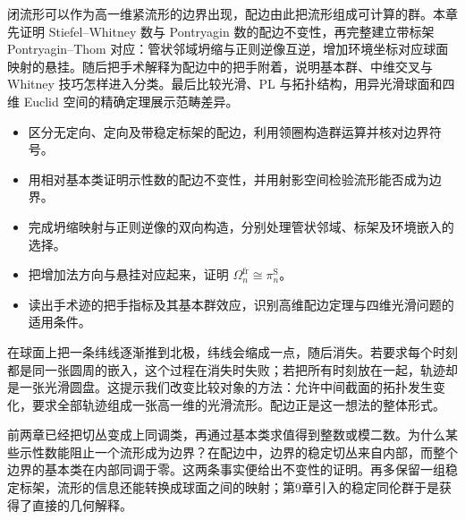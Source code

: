 
% 
% 


\begin{chapterabstract}
	闭流形可以作为高一维紧流形的边界出现，配边由此把流形组成可计算的群。本章先证明 Stiefel--Whitney 数与 Pontryagin 数的配边不变性，再完整建立带标架 Pontryagin--Thom 对应：管状邻域坍缩与正则逆像互逆，增加环境坐标对应球面映射的悬挂。随后把手术解释为配边中的把手附着，说明基本群、中维交叉与 Whitney 技巧怎样进入分类。最后比较光滑、PL 与拓扑结构，用异光滑球面和四维 Euclid 空间的精确定理展示范畴差异。
\end{chapterabstract}

\begin{learninggoals}
	\begin{itemize}
		\item 区分无定向、定向及带稳定标架的配边，利用领圈构造群运算并核对边界符号。
		\item 用相对基本类证明示性数的配边不变性，并用射影空间检验流形能否成为边界。
		\item 完成坍缩映射与正则逆像的双向构造，分别处理管状邻域、标架及环境嵌入的选择。
		\item 把增加法方向与悬挂对应起来，证明 \(\Omega_n^{\mathrm{fr}}\cong\pi_n^{\mathrm S}\)。
		\item 读出手术迹的把手指标及其基本群效应，识别高维配边定理与四维光滑问题的适用条件。
	\end{itemize}
\end{learninggoals}

在球面上把一条纬线逐渐推到北极，纬线会缩成一点，随后消失。若要求每个时刻都是同一张圆周的嵌入，这个过程在消失时失败；若把所有时刻放在一起，轨迹却是一张光滑圆盘。这提示我们改变比较对象的方法：允许中间截面的拓扑发生变化，要求全部轨迹组成一张高一维的光滑流形。配边正是这一想法的整体形式。

\ProseParagraphBreak

前两章已经把切丛变成上同调类，再通过基本类求值得到整数或模二数。为什么某些示性数能阻止一个流形成为边界？在配边中，边界的稳定切丛来自内部，而整个边界的基本类在内部同调于零。这两条事实便给出不变性的证明。再多保留一组稳定标架，流形的信息还能转换成球面之间的映射；第9章引入的稳定同伦群于是获得了直接的几何解释。

